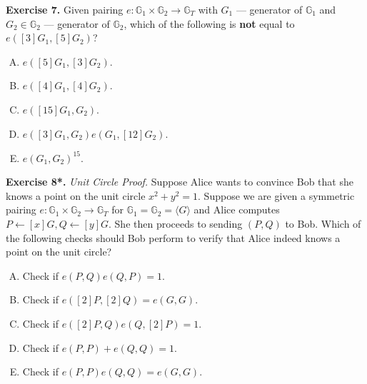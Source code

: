 \documentclass[../lecture-notes.tex]{subfiles}
\begin{document}
\textbf{Exercise 7.} Given pairing $e: \mathbb{G}_1 \times \mathbb{G}_2 \to \mathbb{G}_T$ with $G_1$ --- generator of $\mathbb{G}_1$ and $G_2 \in \mathbb{G}_2$ --- generator of $\mathbb{G}_2$, which of the following is \textbf{not} equal to $e([3]G_1, [5]G_2)$?
\begin{enumerate}[(A)]
    \item $e([5]G_1, [3]G_2)$.
    \item $e([4]G_1, [4]G_2)$.
    \item $e([15]G_1, G_2)$.
    \item $e([3]G_1,G_2)e(G_1,[12]G_2)$.
    \item $e(G_1, G_2)^{15}$.
\end{enumerate} 

\textbf{Exercise 8*.} \textit{Unit Circle Proof.} Suppose Alice wants to convince Bob that she knows a point on the unit circle $x^2+y^2=1$. Suppose we are given a symmetric pairing $e: \mathbb{G}_1 \times \mathbb{G}_2 \to \mathbb{G}_T$ for $\mathbb{G}_1=\mathbb{G}_2=\langle G \rangle$ and Alice computes $P \gets [x]G, Q \gets [y]G$. She then proceeds to sending $(P,Q)$ to Bob. Which of the following checks should Bob perform to verify that Alice indeed knows a point on the unit circle?
\begin{enumerate}[(A)]
    \item Check if $e(P,Q)e(Q,P)=1$.
    \item Check if $e([2]P,[2]Q) = e(G,G)$.
    \item Check if $e([2]P,Q)e(Q,[2]P) = 1$.
    \item Check if $e(P,P)+e(Q,Q) = 1$.
    \item Check if $e(P,P)e(Q,Q)=e(G,G)$.
\end{enumerate}
\end{document}
